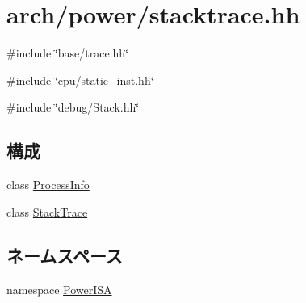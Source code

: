 \hypertarget{power_2stacktrace_8hh}{
\section{arch/power/stacktrace.hh}
\label{power_2stacktrace_8hh}
}
{\ttfamily \#include \char`\"{}base/trace.hh\char`\"{}}\par
{\ttfamily \#include \char`\"{}cpu/static\_\-inst.hh\char`\"{}}\par
{\ttfamily \#include \char`\"{}debug/Stack.hh\char`\"{}}\par
\subsection*{構成}
\begin{DoxyCompactItemize}
\item 
class \hyperlink{classPowerISA_1_1ProcessInfo}{ProcessInfo}
\item 
class \hyperlink{classPowerISA_1_1StackTrace}{StackTrace}
\end{DoxyCompactItemize}
\subsection*{ネームスペース}
\begin{DoxyCompactItemize}
\item 
namespace \hyperlink{namespacePowerISA}{PowerISA}
\end{DoxyCompactItemize}
